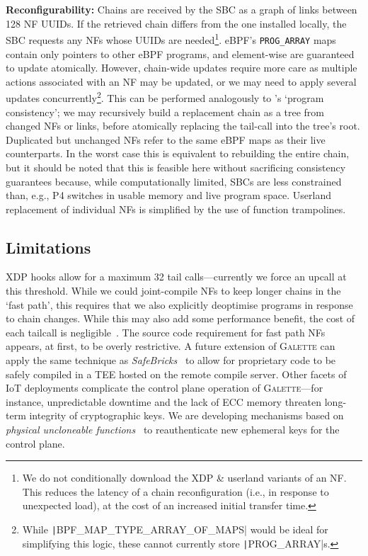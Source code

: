 \documentclass[comsoc, conference, times]{IEEEtran}
\newcommand{\ourtech}{\textsc{Galette}}
\newcommand{\fakepara}[1]{\noindent\textbf{#1:}}
\begin{document}
\fakepara{Reconfigurability}
Chains are received by the SBC as a graph of links between \qty{128}{\bit} NF UUIDs.
If the retrieved chain differs from the one installed locally, the SBC requests any NFs whose UUIDs are needed\footnote{We do not conditionally download the XDP \& userland variants of an NF. This reduces the latency of a chain reconfiguration (i.e., in response to unexpected load), at the cost of an increased initial transfer time.}.
eBPF's \texttt{PROG\_ARRAY} maps contain only pointers to other eBPF programs, and element-wise are guaranteed to update atomically.
However, chain-wide updates require more care as multiple actions associated with an NF may be updated, or we may need to apply several updates concurrently\footnote{While \texttt|BPF_MAP_TYPE_ARRAY_OF_MAPS| would be ideal for simplifying this logic, these cannot currently store \texttt|PROG_ARRAY|s.}.
This can be performed analogously to \textcite{DBLP:conf/nsdi/XingHKLPKC22}'s `program consistency'; we may recursively build a replacement chain as a tree from changed NFs or links, before atomically replacing the tail-call into the tree's root.
Duplicated but unchanged NFs refer to the same eBPF maps as their live counterparts.
In the worst case this is equivalent to rebuilding the entire chain, but it should be noted that this is feasible here without sacrificing consistency guarantees because, while computationally limited, SBCs are less constrained than, e.g., P4 switches in usable memory and live program space.
Userland replacement of individual NFs is simplified by the use of function trampolines.

%
%

\subsection{Limitations}
XDP hooks allow for a maximum \num{32} tail calls---currently we force an upcall at this threshold.
While we could joint-compile NFs to keep longer chains in the `fast path', this requires that we also explicitly deoptimise programs in response to chain changes.
While this may also add some performance benefit, the cost of each tailcall is negligible~\parencite{DBLP:journals/tnsm/MianoRBBL21}.
The source code requirement for fast path NFs appears, at first, to be overly restrictive.
A future extension of \ourtech{} can apply the same technique as \emph{SafeBricks}~\parencite{DBLP:conf/nsdi/PoddarLPR18} to allow for proprietary code to be safely compiled in a TEE hosted on the remote compile server.
Other facets of IoT deployments complicate the control plane operation of \ourtech{}---for instance, unpredictable downtime and the lack of ECC memory threaten long-term integrity of cryptographic keys.
We are developing mechanisms based on \emph{physical uncloneable functions}~\parencite{Gao2020} to reauthenticate new ephemeral keys for the control plane.
\end{document}
